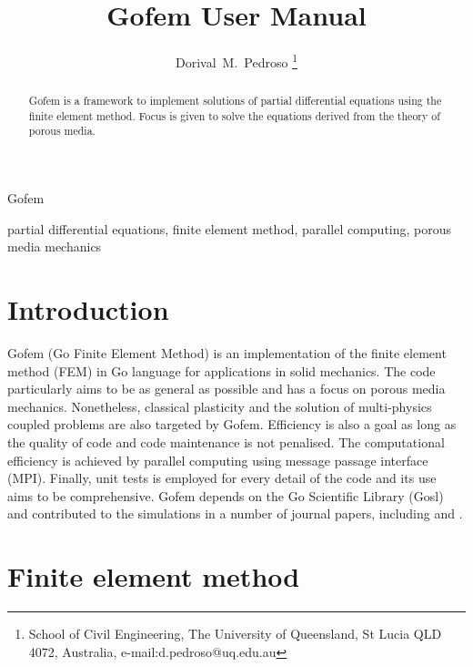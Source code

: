 \documentclass[twoside,journal]{IEEEtran}
\begin{document}
\title{Gofem User Manual}

\author{Dorival~M.~Pedroso%
\thanks{School of Civil Engineering, The University of Queensland, St Lucia QLD 4072, Australia,
e-mail:d.pedroso@uq.edu.au}}

{Gofem}

\maketitle




\begin{abstract}

Gofem is a framework to implement solutions of partial differential equations using the finite
element method. Focus is given to solve the equations derived from the theory of porous media.

\end{abstract}

\begin{IEEEkeywords}
partial differential equations, finite element method, parallel computing, porous media mechanics
\end{IEEEkeywords}



\section{Introduction}
\label{sec:intro}

Gofem (Go Finite Element Method) is an implementation of the finite element method (FEM) in Go
language for applications in solid mechanics. The code particularly aims to be as general as
possible and has a focus on porous media mechanics. Nonetheless, classical plasticity and the
solution of multi-physics coupled problems are also targeted by Gofem. Efficiency is also a goal as
long as the quality of code and code maintenance is not penalised. The computational efficiency is
achieved by parallel computing using message passage interface (MPI). Finally, unit tests is
employed for every detail of the code and its use aims to be comprehensive. Gofem depends on the Go
Scientific Library (Gosl) and contributed to the simulations in a number of journal papers,
including \cite{pedroso:15a} and \cite{pedroso:15b}.



\section{Finite element method}
\end{document}
